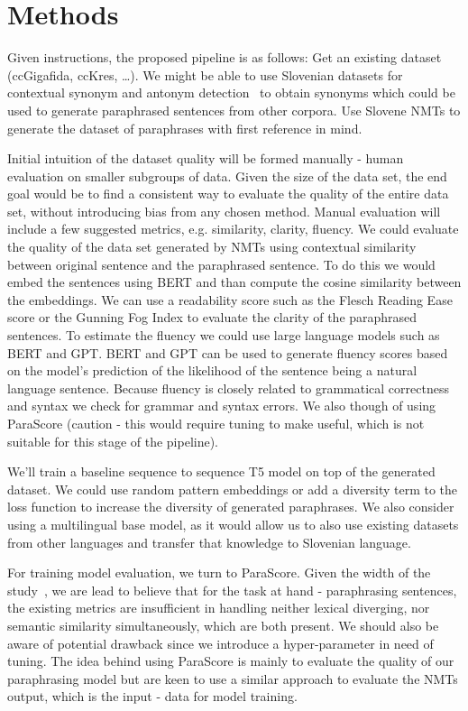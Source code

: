 \documentclass[fleqn,moreauthors,10pt]{ds_report}
\begin{document}


\section*{Methods}

Given instructions, the proposed pipeline is as follows: Get an existing dataset (ccGigafida, ccKres, …). We might be able to use {Slovenian datasets for contextual synonym and antonym detection}~\cite{11356/1694} to obtain synonyms which could be used to generate paraphrased sentences from other corpora. Use Slovene NMTs to generate the dataset of paraphrases with first reference in mind.

 Initial intuition of the dataset quality will be formed manually - human evaluation on smaller subgroups of data. Given the size of the data set, the end goal would be to find a consistent way to evaluate the quality of the entire data set, without introducing bias from any chosen method. Manual evaluation will include a few suggested metrics, e.g. similarity, clarity, fluency. We could evaluate the quality of the data set generated by NMTs using contextual similarity between original sentence and the paraphrased sentence. To do this we would embed the sentences using BERT and than compute the cosine similarity between the embeddings. We can use a readability score such as the Flesch Reading Ease score or the Gunning Fog Index to evaluate the clarity of the paraphrased sentences. To estimate the fluency we could use large language models such as BERT and GPT. BERT and GPT can be used to generate fluency scores based on the model's prediction of the likelihood of the sentence being a natural language sentence. Because fluency is closely related to grammatical correctness and syntax we check for grammar and syntax errors. We also though of using ParaScore (caution - this would require tuning to make useful, which is not suitable for this stage of the pipeline).

 We'll train a baseline sequence to sequence T5 model on top of the generated dataset. We could use random pattern embeddings or add a diversity term to the loss function to increase the diversity of generated paraphrases. We also consider using a multilingual base model, as it would allow us to also use existing datasets from other languages and transfer that knowledge to Slovenian language.

For training model evaluation, we turn to ParaScore. Given the width of the study~\cite{evaluation-metrics-in-paraphrase-generation}, we are lead to believe that for the task at hand - paraphrasing sentences, the existing metrics are insufficient in handling neither lexical diverging, nor semantic similarity simultaneously, which are both present. We should also be aware of potential drawback since we introduce a hyper-parameter in need of tuning. The idea behind using ParaScore is mainly to evaluate the quality of our paraphrasing model but are keen to use a similar approach to evaluate the NMTs output, which is the input - data for model training.
\end{document}
